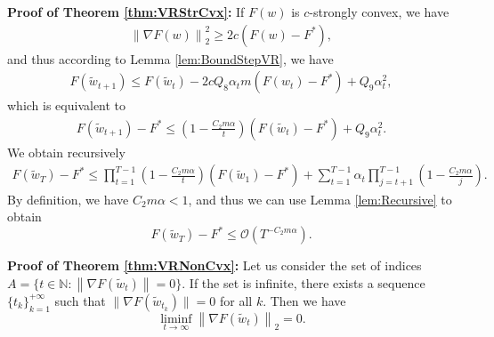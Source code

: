 \documentclass[twoside]{article}
\def\OO{\mathcal{O}}
\begin{document}
\textbf{Proof of Theorem \ref{thm:VRStrCvx}:} If $F(w)$ is $c$-strongly convex, we have
\begin{eqnarray}
\left\|\nabla F(w)\right\|_2^2 \geq 2c\left(F(w) - F^*\right),\nonumber
\end{eqnarray}
and thus according to Lemma \ref{lem:BoundStepVR}, we have
\begin{eqnarray}
F(\widetilde w_{t+1}) \leq F(\widetilde w_t) - 2cQ_8\alpha_t m \left(F(w_t)-F^*\right) + Q_9 \alpha_t^2\nonumber,
\end{eqnarray}
which is equivalent to
\begin{eqnarray}
F(\widetilde w_{t+1}) - F^* \leq \left( 1 - \frac{C_2 m \alpha}{t}\right)\left(F(\widetilde w_t) - F^*\right) + Q_9 \alpha_t^2 \nonumber.
\end{eqnarray}
We obtain recursively
\begin{eqnarray}
F(\widetilde w_T) - F^* \leq \prod_{t=1}^{T-1}\left(1-\frac{C_2m\alpha}{t}\right) (F(\widetilde w_1) - F^*) + \sum_{t=1}^{T-1}\alpha_t \prod_{j=t+1}^{T-1} \left(1-\frac{C_2m\alpha}{j}\right). \nonumber
\end{eqnarray}
By definition, we have $C_2m\alpha<1$, and thus we can use Lemma \ref{lem:Recursive} to obtain
\begin{equation}
    F(\widetilde w_T) - F^* \leq \OO\left(T^{-C_2m\alpha}\right).\nonumber
\end{equation}

\textbf{Proof of Theorem \ref{thm:VRNonCvx}:} 
Let us consider the set of indices $A=\{t\in\mathbb{N}:\left\|\nabla F(\widetilde w_t)\right\|=0\}$. If the set is infinite, there exists a sequence $\{t_k\}_{k=1}^{+\infty}$ such that $\|\nabla F(\widetilde w_{t_k})\|=0$ for all $k$. Then we have 
$$\liminf_{t\to\infty} \left\|\nabla F(\widetilde w_t)\right\|_2 = 0.$$ 
\end{document}
